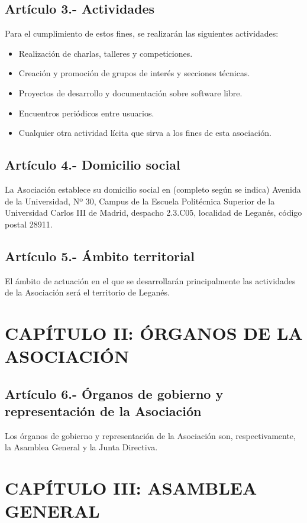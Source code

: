 \documentclass[12pt]{article}
\begin{document}
\subsection{Artículo 3.- Actividades}
Para el cumplimiento de estos fines, se realizarán las siguientes actividades:
\begin{itemize}
    \item Realización de charlas, talleres y competiciones.
    \item Creación y promoción de grupos de interés y secciones técnicas.
    \item Proyectos de desarrollo y documentación sobre software libre.
    \item Encuentros periódicos entre usuarios.
    \item Cualquier otra actividad lícita que sirva a los fines de esta asociación.
\end{itemize}

\subsection{Artículo 4.- Domicilio social}
La Asociación establece su domicilio social en (completo según se indica) Avenida de la Universidad, Nº 30, Campus de la Escuela Politécnica Superior de la Universidad Carlos III de Madrid, despacho 2.3.C05, localidad de Leganés, código postal 28911.

\subsection{Artículo 5.- Ámbito territorial}
El ámbito de actuación en el que se desarrollarán principalmente las actividades de la Asociación será el territorio de Leganés.


\section{CAPÍTULO II: ÓRGANOS DE LA ASOCIACIÓN}


\subsection{Artículo 6.- Órganos de gobierno y representación de la Asociación}
Los órganos de gobierno y representación de la Asociación son, respectivamente, la Asamblea General y la Junta Directiva.


\section{CAPÍTULO III: ASAMBLEA GENERAL}
\end{document}
